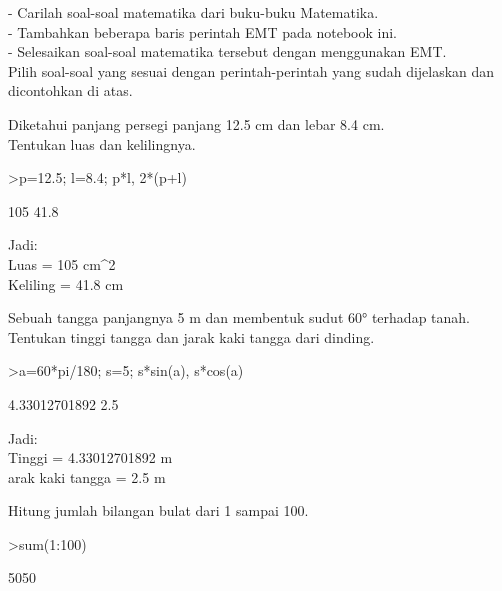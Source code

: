 \documentclass[a4paper,10pt]{article}
\begin{document}
\begin{eulernotebook}
\begin{eulercomment}
\begin{eulercomment}
\begin{eulercomment}
\begin{eulercomment}
\begin{eulercomment}
- Carilah soal-soal matematika dari buku-buku Matematika.\\
- Tambahkan beberapa baris perintah EMT pada notebook ini.\\
- Selesaikan soal-soal matematika tersebut dengan menggunakan EMT.\\
Pilih soal-soal yang sesuai dengan perintah-perintah yang sudah dijelaskan dan
dicontohkan di atas.
\end{eulercomment}
\begin{eulercomment}
Diketahui panjang persegi panjang 12.5 cm dan lebar 8.4 cm.\\
Tentukan luas dan kelilingnya.
\end{eulercomment}
\begin{eulerprompt}
>p=12.5; l=8.4; p*l, 2*(p+l)
\end{eulerprompt}
\begin{euleroutput}
  105
  41.8
\end{euleroutput}
\begin{eulercomment}
Jadi:\\
Luas = 105 cm\textasciicircum{}2\\
Keliling = 41.8 cm
\end{eulercomment}
\begin{eulercomment}
Sebuah tangga panjangnya 5 m dan membentuk sudut 60° terhadap tanah.
Tentukan tinggi tangga dan jarak kaki tangga dari dinding.
\end{eulercomment}
\begin{eulerprompt}
>a=60*pi/180; s=5; s*sin(a), s*cos(a)
\end{eulerprompt}
\begin{euleroutput}
  4.33012701892
  2.5
\end{euleroutput}
\begin{eulercomment}
Jadi:\\
Tinggi = 4.33012701892 m\\
arak kaki tangga = 2.5 m
\end{eulercomment}
\begin{eulercomment}
Hitung jumlah bilangan bulat dari 1 sampai 100.
\end{eulercomment}
\begin{eulerprompt}
>sum(1:100)
\end{eulerprompt}
\begin{euleroutput}
  5050
\end{euleroutput}

\end{eulercomment}
\end{eulercomment}
\end{eulercomment}
\end{eulercomment}
\end{eulernotebook}
\end{document}

